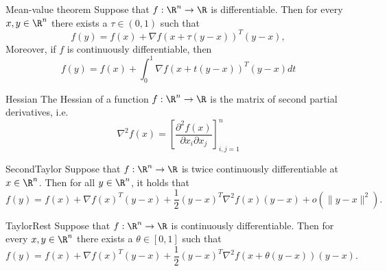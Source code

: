 \begin{lem}{Mean-value theorem}
    Suppose that $f: \R^n \to \R$ is differentiable. Then for every $x,y \in \R^n$ there exists a $\tau \in (0,1)$ such that 
    \begin{equation*}
        f(y) = f(x) + {\nabla f(x + \tau(y - x))}^T (y - x),
    \end{equation*}
    Moreover, if $f$ is continuously differentiable, then 
    \begin{equation*}
        f(y) = f(x) + \int_0^1 {\nabla f(x + t(y - x))}^T (y - x) dt
    \end{equation*}
    \vspace*{-0.3cm}
\end{lem}

\begin{theo}[Hessian]{Hessian}
    \vspace*{-0.2cm}
    The Hessian of a function $f: \R^n \to \R$ is the matrix of second partial derivatives, i\@.e\@.
    \begin{equation*}
        \nabla^2 f(x) = \left[ \frac{\partial^2 f(x)}{\partial x_i \partial x_j} \right]_{i,j=1}^n
    \end{equation*}
    \vspace*{-0.3cm}
\end{theo}

\begin{theo}{SecondTaylor}
    Suppose that $f: \R^n \to \R$ is twice continuously differentiable at $x \in \R^n$. Then for all $y \in \R^n$, it holds that
    \begin{equation*}
        f(y) = f(x) + {\nabla {f(x)}}^T (y - x) + \frac{1}{2} {(y - x)}^T \nabla^2 f(x)(y-x) + o(\|y-x\|^2).
    \end{equation*}
    \vspace*{-0.3cm}
\end{theo}

\begin{lem}{TaylorRest}
    Suppose that $f: \R^n \to \R$ is continuously differentiable. Then for every $x,y \in \R^n$ there exists a $\theta \in [0,1]$ such that 
    \begin{equation*}
        f(y) = f(x) + \nabla {f(x)}^T (y - x) + \frac{1}{2} (y - x)^T \nabla^2 f(x + \theta(y - x)) (y - x).
    \end{equation*}
    \vspace*{-0.3cm}
\end{lem}


